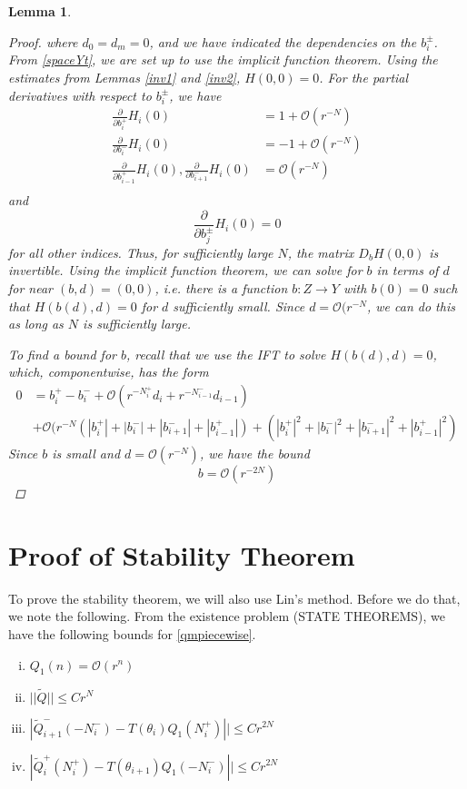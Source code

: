 \documentclass[12pt]{article}
\newtheorem{lemma}{Lemma}
\begin{document}
\begin{lemma}
\begin{proof}
where $d_0 = d_m = 0$, and we have indicated the dependencies on the $b_i^\pm$. From \eqref{spaceYt}, we are set up to use the implicit function theorem. Using the estimates from Lemmas \ref{inv1} and \ref{inv2}, $H(0, 0) = 0$. For the partial derivatives with respect to $b_i^\pm$, we have
\begin{align*}
\frac{\partial}{\partial b_i^+}H_i(0) &= 1 + \mathcal{O}(r^{-N})  \\
\frac{\partial}{\partial b_i^-}H_i(0) &= -1 + \mathcal{O}(r^{-N}) \\
\frac{\partial}{\partial b_{i-1}^+}H_i(0),
\frac{\partial}{\partial b_{i+1}^-}H_i(0) &= \mathcal{O}(r^{-N}) \\
\end{align*}
and 
\[
\frac{\partial}{\partial b_j^\pm}H_i(0) = 0
\]
for all other indices. Thus, for sufficiently large $N$, the matrix $D_b H(0,0)$ is invertible. Using the implicit function theorem, we can solve for $b$ in terms of $d$ for near $(b,d) = (0, 0)$, i.e. there is a function $b: Z \rightarrow Y$ with $b(0) = 0$ such that $H(b(d),d) = 0$ for $d$ sufficiently small. Since $d = \mathcal{O}(r^{-N}$, we can do this as long as $N$ is sufficiently large.

To find a bound for $b$, recall that we use the IFT to solve $H(b(d),d) = 0$, which, componentwise, has the form
\begin{align*}
0 &= b_i^+ - b_i^- + \mathcal{O}(r^{-N_i^+} d_i + r^{-N_{i-1}^-} d_{i-1}) \\
&+ \mathcal{O}( r^{-N}(|b_i^+| + |b_i^-| + |b_{i+1}^-| + |b_{i-1}^+|)
+ (|b_i^+|^2 + |b_i^-|^2 + |b_{i+1}^-|^2 + |b_{i-1}^+|^2)
\end{align*}
Since $b$ is small and $d = \mathcal{O}(r^{-N})$, we have the bound
\[
b = \mathcal{O}(r^{-2N})
\]

\end{proof}
\end{lemma}

\section{Proof of Stability Theorem}
To prove the stability theorem, we will also use Lin's method. Before we do that, we note the following. From the existence problem (STATE THEOREMS), we have the following bounds for \eqref{qmpiecewise}.
\begin{enumerate}[(i)]
\item $Q_1(n) = \mathcal{O}(r^n)$
\item $||\tilde{Q}|| \leq C r^N$
\item $|\tilde{Q}_{i+1}^-(-N_i^-) - T(\theta_i) Q_1(N_i^+)|| \leq C r^{2N}$ 
\item $|\tilde{Q}_i^+(N_i^+) - T(\theta_{i+1}) Q_1(-N_i^-)|| \leq C r^{2N}$
\end{enumerate}
\end{document}

